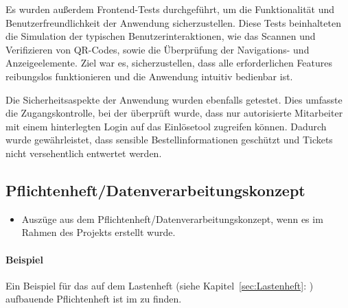 Es wurden außerdem Frontend-Tests durchgeführt, um die Funktionalität und Benutzerfreundlichkeit der Anwendung sicherzustellen. Diese Tests beinhalteten die Simulation der typischen Benutzerinteraktionen, wie das Scannen und Verifizieren von QR-Codes, sowie die Überprüfung der Navigations- und Anzeigeelemente. Ziel war es, sicherzustellen, dass alle erforderlichen Features reibungslos funktionieren und die Anwendung intuitiv bedienbar ist.

Die Sicherheitsaspekte der Anwendung wurden ebenfalls getestet. Dies umfasste die Zugangskontrolle, bei der überprüft wurde, dass nur autorisierte Mitarbeiter mit einem hinterlegten Login auf das Einlösetool zugreifen können. Dadurch wurde gewährleistet, dass sensible Bestellinformationen geschützt und Tickets nicht versehentlich entwertet werden.

\subsection{Pflichtenheft/Datenverarbeitungskonzept}
\label{sec:Pflichtenheft}
\begin{itemize}
	\item Auszüge aus dem Pflichtenheft/Datenverarbeitungskonzept, wenn es im Rahmen des Projekts erstellt wurde.
\end{itemize}

\paragraph{Beispiel}
Ein Beispiel für das auf dem Lastenheft (siehe Kapitel~\ref{sec:Lastenheft}: ) aufbauende Pflichtenheft ist im  zu finden.

